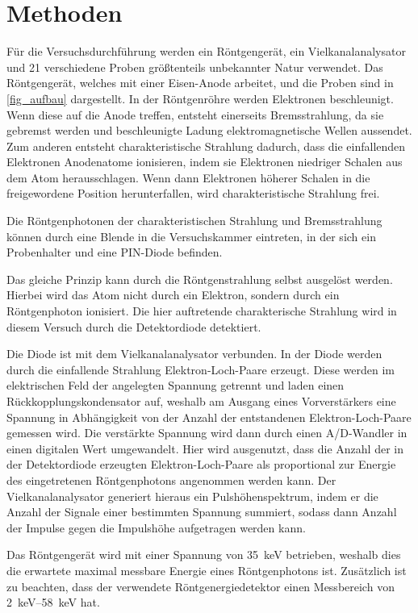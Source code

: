 \documentclass[
	a4paper,
	12pt,
	pagesize,
	ngerman
]{scrartcl}
\begin{document}
	\section{Methoden}
	Für die Versuchsdurchführung werden ein Röntgengerät, ein Vielkanalanalysator und 21 verschiedene Proben größtenteils unbekannter Natur verwendet.
	Das Röntgengerät, welches mit einer Eisen-Anode arbeitet, und die Proben sind in \cref{fig_aufbau} dargestellt.
	In der Röntgenröhre werden Elektronen beschleunigt.
	Wenn diese auf die Anode treffen, entsteht einerseits Bremsstrahlung, da sie gebremst werden und beschleunigte Ladung elektromagnetische Wellen aussendet. %
	Zum anderen entsteht charakteristische Strahlung dadurch, dass die einfallenden Elektronen Anodenatome ionisieren, indem sie Elektronen niedriger Schalen aus dem Atom herausschlagen.
	Wenn dann Elektronen höherer Schalen in die freigewordene Position herunterfallen, wird charakteristische Strahlung frei.

	Die Röntgenphotonen der charakteristischen Strahlung und Bremsstrahlung können durch eine Blende in die Versuchskammer eintreten, in der sich ein Probenhalter und eine PIN-Diode befinden.

	Das gleiche Prinzip kann durch die Röntgenstrahlung selbst ausgelöst werden.
	Hierbei wird das Atom nicht durch ein Elektron, sondern durch ein Röntgenphoton ionisiert.
	Die hier auftretende charakterische Strahlung wird in diesem Versuch durch die Detektordiode detektiert.

	Die Diode ist mit dem Vielkanalanalysator verbunden.
	In der Diode werden durch die einfallende Strahlung Elektron-Loch-Paare erzeugt.
	Diese werden im elektrischen Feld der angelegten Spannung getrennt und laden einen Rückkopplungskondensator auf, weshalb am Ausgang eines Vorverstärkers eine Spannung in Abhängigkeit von der Anzahl der entstandenen Elektron-Loch-Paare gemessen wird.
	Die verstärkte Spannung wird dann durch einen A/D-Wandler in einen digitalen Wert umgewandelt.
	Hier wird ausgenutzt, dass die Anzahl der in der Detektordiode erzeugten Elektron-Loch-Paare als proportional zur Energie des eingetretenen Röntgenphotons angenommen werden kann.
	Der Vielkanalanalysator generiert hieraus ein Pulshöhenspektrum, indem er die Anzahl der Signale einer bestimmten Spannung summiert, sodass dann Anzahl der Impulse gegen die Impulshöhe aufgetragen werden kann.

	Das Röntgengerät wird mit einer Spannung von \SI{35}{\kilo \electronvolt} betrieben, weshalb dies die erwartete maximal messbare Energie eines Röntgenphotons ist.
	Zusätzlich ist zu beachten, dass der verwendete Röntgenergiedetektor einen Messbereich von \SIrange{2}{58}{keV} hat.
\end{document}
